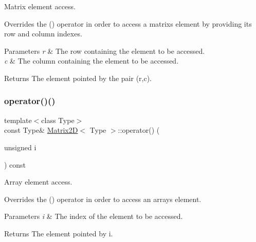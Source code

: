 Matrix element access. 

Overrides the \textquotesingle{}()\textquotesingle{} operator in order to access a matrix\textquotesingle{}s element by providing its row and column indexes. 
\begin{DoxyParams}{Parameters}
{\em r} & The row containing the element to be accessed. \\
\hline
{\em c} & The column containing the element to be accessed. \\
\hline
\end{DoxyParams}
\begin{DoxyReturn}{Returns}
The element pointed by the pair (r,c). 
\end{DoxyReturn}
\mbox{\label{classMatrix2D_ac5b60589d9d867150e045887aaebe5b0}} 
\subsubsection{\texorpdfstring{operator()()}{operator()()}\hspace{0.1cm}{\footnotesize\ttfamily [3/4]}}
{\footnotesize\ttfamily template$<$class Type$>$ \\
const Type\& \mbox{\hyperlink{classMatrix2D}{Matrix2D}}$<$ Type $>$\+::operator() (\begin{DoxyParamCaption}\item[{unsigned}]{i }\end{DoxyParamCaption}) const\hspace{0.3cm}{\ttfamily [inline]}}



Array element access. 

Overrides the \textquotesingle{}()\textquotesingle{} operator in order to access an array\textquotesingle{}s element. 
\begin{DoxyParams}{Parameters}
{\em i} & The index of the element to be accessed. \\
\hline
\end{DoxyParams}
\begin{DoxyReturn}{Returns}
The element pointed by i. 
\end{DoxyReturn}
\mbox{\label{classMatrix2D_afebec0a3fc73a157fe8044416fb6d0b3}} 
